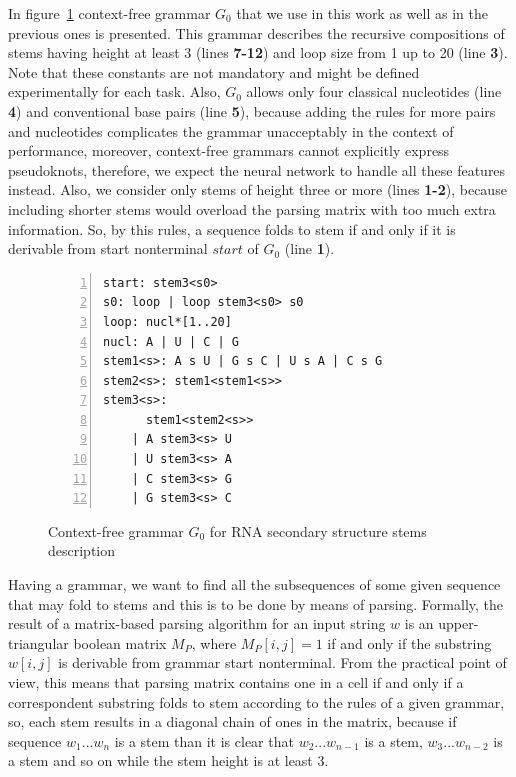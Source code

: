 In figure~\ref{gram} context-free grammar $G_0$ that we use in this work as well as in the previous ones is presented. This grammar describes the recursive compositions of stems having height at least 3 (lines \textbf{7-12}) and loop size from 1 up to 20 (line \textbf{3}). Note that these constants are not mandatory and might be defined experimentally for each task. Also, $G_0$ allows only four classical nucleotides (line \textbf{4}) and conventional base pairs (line \textbf{5}), because adding the rules for more pairs and nucleotides complicates the grammar unacceptably in the context of performance, moreover, context-free grammars cannot explicitly express pseudoknots, therefore, we expect the neural network to handle all these features instead. Also, we consider only stems of height three or more (lines \textbf{1-2}), because including shorter stems would overload the parsing matrix with too much extra information. So, by this rules, a sequence folds to stem if and only if it is derivable from start nonterminal $start$ of $G_0$ (line \textbf{1}).

\begin{figure}[ht]
\begin{Verbatim}[numbers=left,xleftmargin=5mm]
start: stem3<s0>
s0: loop | loop stem3<s0> s0
loop: nucl*[1..20]
nucl: A | U | C | G
stem1<s>: A s U | G s C | U s A | C s G
stem2<s>: stem1<stem1<s>>
stem3<s>: 
      stem1<stem2<s>>
    | A stem3<s> U
    | U stem3<s> A
    | C stem3<s> G
    | G stem3<s> C
\end{Verbatim}
\caption{Context-free grammar $G_0$ for RNA secondary structure stems description}
\label{gram}
\end{figure}

Having a grammar, we want to find all the subsequences of some given sequence that may fold to stems and this is to be done by means of parsing. Formally, the result of a matrix-based parsing algorithm for an input string $w$ is an upper-triangular boolean matrix $M_P$, where $M_P [i,j] = 1$ if and only if the substring $w[i,j]$ is derivable from grammar start nonterminal. From the practical point of view, this means that parsing matrix contains one in a cell if and only if a correspondent substring folds to stem according to the rules of a given grammar, so, each stem results in a diagonal chain of ones in the matrix, because if sequence $w_1...w_n$ is a stem than it is clear that $w_2...w_{n - 1}$ is a stem, $w_3...w_{n - 2}$ is a stem and so on while the stem height is at least 3.

